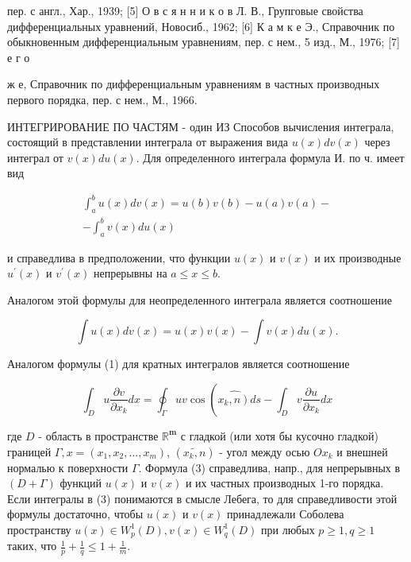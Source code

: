 \documentclass[10pt]{article}
\begin{document}
пер. с англ., Хар., 1939; [5] О в с я н н и к о в Л. В., Групговые свойства дифференциальных уравнений, Новосиб., 1962; [6] К а м к е Э., Справочник по обыкновенным дифференциальным уравнениям, пер. с нем., 5 изд., М., 1976; [7] е г о

ж е, Справочник по дифференциальным уравнениям в частных производных первого порядка, пер. с нем., М., 1966.



ИНТЕГРИРОВАНИЕ ПО ЧАСТЯМ - один ИЗ Способов вычисления интеграла, состоящий в представлении интеграла от выражения вида $u(x) d v(x)$ через интеграл от $v(x) d u(x)$. Для определенного интеграла формула И. по ч. имеет вид



\[

\begin{gathered}

\int_{a}^{b} u(x) d v(x)=u(b) v(b)-u(a) v(a)- \\

-\int_{a}^{b} v(x) d u(x)

\end{gathered}

\]



и справедлива в предположении, что функции $u(x)$ и $v(x)$ и их производные $u^{\prime}(x)$ и $v^{\prime}(x)$ непрерывны на $a \leqslant x \leqslant b$.



Аналогом этой формулы для неопределенного интеграла является соотношение



\[

\int u(x) d v(x)=u(x) v(x)-\int v(x) d u(x) .

\]



Аналогом формулы (1) для кратных интегралов является соотношение



\[

\int_{D} u \frac{\partial v}{\partial x_{k}} d x=\oint_{\Gamma} u v \cos \left(\widehat{\left.x_{k}, n\right)} d s-\int_{D} v \frac{\partial u}{\partial x_{k}} d x\right.

\]



где $D$ - область в пространстве $\mathbb{R}^{\boldsymbol{m}}$ с гладкой (или хотя бы кусочно гладкой) границей $\Gamma, x=\left(x_{1}, x_{2}, \ldots, x_{m}\right)$, $\left(\widetilde{x_{k}, n}\right)$ - угол между осью $O x_{k}$ и внешней нормалью к поверхности $\Gamma$. Формула (3) справедлива, напр., для непрерывных в $(D+\Gamma)$ функций $u(x)$ и $v(x)$ и их частных производных 1-го порядка. Если интегралы в (3) понимаются в смысле Лебега, то для справедливости этой формулы достаточно, чтобы $u(x)$ и $v(x)$ принадлежали Соболева пространству $u(x) \in W_{p}^{1}(D), v(x) \in W_{q}^{1}(D)$ при любых $p \geqslant 1, q \geqslant 1$ таких, что $\frac{1}{p}+\frac{1}{q} \leqslant 1+\frac{1}{m}$.
\end{document}
